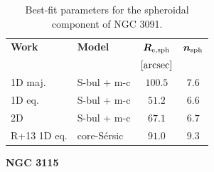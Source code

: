 \documentclass[preprint2]{emulateapj}
\begin{document}
  \begin{table}[h]
  \small
  \caption{Best-fit parameters for the spheroidal component of NGC 3091.}
  \begin{center}
  \begin{tabular}{llcc}
  \hline
  {\bf Work} & {\bf Model}   & $\bm R_{\rm e,sph}$    & $\bm n_{\rm sph}$ \\
    &  &  $[\rm arcsec]$ & \\
  \hline
  1D maj. & S-bul + m-c & $100.5$  &  $7.6$ \\
  1D eq.  & S-bul + m-c & $51.2$	&  $6.6$ \\
  2D      & S-bul + m-c & $67.1$	&  $6.7$ \\
  \hline
  R+13 1D eq.         & core-S\'ersic & $91.0$  &  $9.3$ \\
  \hline
  \end{tabular}
  \end{center}
  \label{tab:n3091}
  \end{table}


  \clearpage\newpage\noindent
  {\bf NGC 3115 \\}
\end{document}
